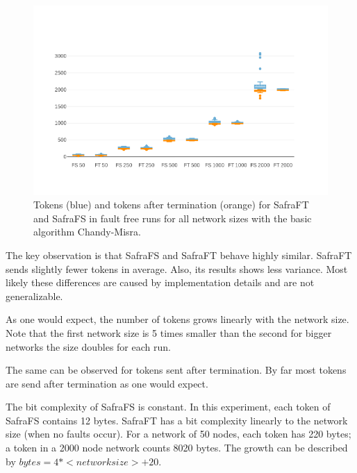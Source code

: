\begin{figure}
	\includegraphics{figures/tokens-and-tokens-after-cm.png}
	\caption{Tokens (blue) and tokens after termination (orange) for SafraFT and SafraFS in fault free runs for all network sizes with the basic algorithm Chandy-Misra.}
	\label{fig:tokens-and-tokens-after-cm}
\end{figure}



The key observation is that SafraFS and SafraFT behave highly similar.
SafraFT sends slightly fewer tokens in average.
Also, its results shows less variance.
Most likely these differences are caused by implementation details and are not generalizable.

As one would expect, the number of tokens grows linearly with the network size.
Note that the first network size is 5 times smaller than the second for bigger networks the size doubles for each run.

The same can be observed for tokens sent after termination.
By far most tokens are send after termination as one would expect.

The bit complexity of SafraFS is constant.
In this experiment, each token of SafraFS contains 12 bytes.
SafraFT has a bit complexity linearly to the network size (when no faults occur).
For a network of 50 nodes, each token has 220 bytes; a token in a 2000 node network counts 8020 bytes.
The growth can be described by $bytes = 4 * <network size> + 20$.

